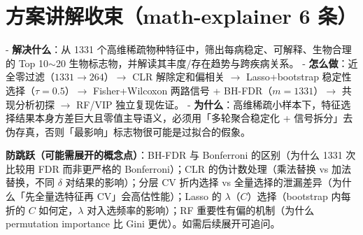 \documentclass{internal-report}
\begin{document}
\section{方案讲解收束（math-explainer 6 条）}

- \textbf{解决什么}：从 1331 个高维稀疏物种特征中，筛出每病稳定、可解释、生物合理的 Top 10$\sim$20 生物标志物，并解读其丰度/存在趋势与跨疾病关系。
- \textbf{怎么做}：近全零过滤（$1331\to264$）$\to$ CLR 解除定和偏相关 $\to$ Lasso+bootstrap 稳定性选择（$\tau=0.5$）$\to$ Fisher+Wilcoxon 两路信号 + BH-FDR（$m=1331$）$\to$ 共现分析初探 $\to$ RF/VIP 独立复现佐证。
- \textbf{为什么}：高维稀疏小样本下，特征选择结果本身方差巨大且零值主导语义，必须用「多轮聚合稳定化 + 信号拆分」去伪存真，否则「最影响」标志物很可能是过拟合的假象。

\textbf{防跳跃（可能需展开的概念点）}：BH-FDR 与 Bonferroni 的区别（为什么 1331 次比较用 FDR 而非更严格的 Bonferroni）；CLR 的伪计数处理（乘法替换 vs 加法替换，不同 $\delta$ 对结果的影响）；分层 CV 折内选择 vs 全量选择的泄漏差异（为什么「先全量选特征再 CV」会高估性能）；Lasso 的 $\lambda$（$C$）选择（bootstrap 内每折的 $C$ 如何定，$\lambda$ 对入选频率的影响）；RF 重要性有偏的机制（为什么 permutation importance 比 Gini 更优）。如需后续展开可追问。
\end{document}
